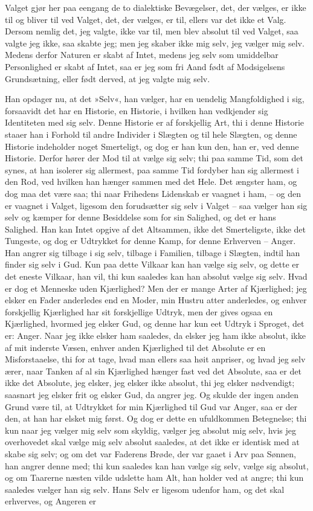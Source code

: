 \documentclass[12pt,a4paper]{article}
\begin{document}
Valget gjør her paa eengang de to dialektiske Bevægelser, det, der vælges, er ikke til og bliver til ved Valget, det, der vælges, er til, ellers var det ikke et Valg. Dersom nemlig det, jeg valgte, ikke var til, men blev absolut til ved Valget, saa valgte jeg ikke, saa skabte jeg; men jeg skaber ikke mig selv, jeg vælger mig selv. Medens derfor Naturen er skabt af Intet, medens jeg selv som umiddelbar Personlighed er skabt af Intet, saa er jeg som fri Aand født af Modsigelsens Grundsætning, eller født derved, at jeg valgte mig selv.

Han opdager nu, at det »Selv«, han vælger, har en uendelig Mangfoldighed i sig, forsaavidt det har en Historie, en Historie, i hvilken han vedkjender sig Identiteten med sig selv. Denne Historie er af forskjellig Art, thi i denne Historie staaer han i Forhold til andre Individer i Slægten og til hele Slægten, og denne Historie indeholder noget Smerteligt, og dog er han kun den, han er, ved denne Historie. Derfor hører der Mod til at vælge sig selv; thi paa samme Tid, som det synes, at han isolerer sig allermest, paa samme Tid fordyber han sig allermest i den Rod, ved hvilken han hænger sammen med det Hele. Det ængster ham, og dog maa det være saa; thi naar Frihedens Lidenskab er vaagnet i ham, – og den er vaagnet i Valget, ligesom den forudsætter sig selv i Valget – saa vælger han sig selv og kæmper for denne Besiddelse som for sin Salighed, og det er hans Salighed. Han kan Intet opgive af det Altsammen, ikke det Smerteligste, ikke det Tungeste, og dog er Udtrykket for denne Kamp, for denne Erhverven – Anger. Han angrer sig tilbage i sig selv, tilbage i Familien, tilbage i Slægten, indtil han finder sig selv i Gud. Kun paa dette Vilkaar kan han vælge sig selv, og dette er det eneste Vilkaar, han vil, thi kun saaledes kan han absolut vælge sig selv. Hvad er dog et Menneske uden Kjærlighed? Men der er mange Arter af Kjærlighed; jeg elsker en Fader anderledes end en Moder, min Hustru atter anderledes, og enhver forskjellig Kjærlighed har sit forskjellige Udtryk, men der gives ogsaa en Kjærlighed, hvormed jeg elsker Gud, og denne har kun eet Udtryk i Sproget, det er: Anger. Naar jeg ikke elsker ham saaledes, da elsker jeg ham ikke absolut, ikke af mit inderste Væsen, enhver anden Kjærlighed til det Absolute er en Misforstaaelse, thi for at tage, hvad man ellers saa høit anpriser, og hvad jeg selv ærer, naar Tanken af al sin Kjærlighed hænger fast ved det Absolute, saa er det ikke det Absolute, jeg elsker, jeg elsker ikke absolut, thi jeg elsker nødvendigt; saasnart jeg elsker frit og elsker Gud, da angrer jeg. Og skulde der ingen anden Grund være til, at Udtrykket for min Kjærlighed til Gud var Anger, saa er der den, at han har elsket mig først. Og dog er dette en ufuldkommen Betegnelse; thi kun naar jeg vælger mig selv som skyldig, vælger jeg absolut mig selv, hvis jeg overhovedet skal vælge mig selv absolut saaledes, at det ikke er identisk med at skabe sig selv; og om det var Faderens Brøde, der var gaaet i Arv paa Sønnen, han angrer denne med; thi kun saaledes kan han vælge sig selv, vælge sig absolut, og om Taarerne næsten vilde udslette ham Alt, han holder ved at angre; thi kun saaledes vælger han sig selv. Hans Selv er ligesom udenfor ham, og det skal erhverves, og Angeren er 
\end{document}
